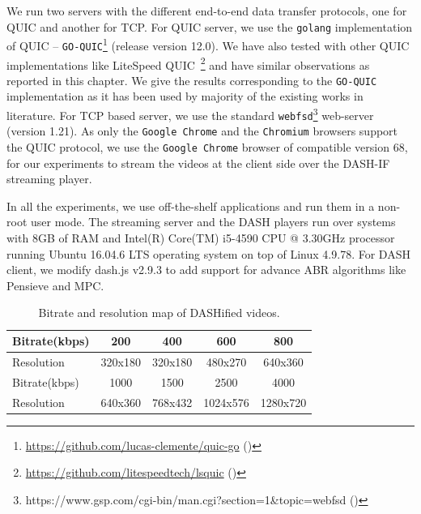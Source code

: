 We run two servers with the different end-to-end data transfer protocols, one for \ac{QUIC} and another for \ac{TCP}. For \ac{QUIC} server, we use the {\tt golang} implementation of \ac{QUIC} -- \texttt{GO-QUIC}\footnote{\url{https://github.com/lucas-clemente/quic-go} (\lastaccessedtoday)} (release version 12.0). We have also tested with other \ac{QUIC} implementations like LiteSpeed \ac{QUIC}~\footnote{\url{https://github.com/litespeedtech/lsquic} (\lastaccessedtoday)} and have similar observations as reported in this chapter. We give the results corresponding to the \texttt{GO-QUIC} implementation as it has been used by majority of the existing works in literature. For TCP based server, we use the standard {\tt webfsd}\footnote{https://www.gsp.com/cgi-bin/man.cgi?section=1\&topic=webfsd (\lastaccessedtoday)} web-server (version 1.21). As only the {\tt Google Chrome} and the {\tt Chromium} browsers support the \ac{QUIC} protocol, we use the {\tt Google Chrome} browser of compatible version 68, for our experiments to stream the videos at the client side over the \ac{DASH-IF} streaming player.


In all the experiments, we use off-the-shelf applications and run them in a non-root user mode. The streaming server and the \ac{DASH} players run over systems with 8GB of RAM and Intel(R) Core(TM) i5-4590 CPU @ 3.30GHz processor running Ubuntu 16.04.6 LTS operating system on top of Linux 4.9.78. For \ac{DASH} client, we modify dash.js v2.9.3 to add support for advance \ac{ABR} algorithms like Pensieve and MPC.


\begin{table}[h]
     \caption{\label{table:chap03s2:bitrate}Bitrate and resolution map of DASHified videos.}
	\centering
	\begin{tabular}{|l|c|c|c|c|}
		\hline
		Bitrate(kbps) & 200 & 400 & 600 & 800 \\ \hline
		Resolution & 320x180 & 320x180 & 480x270 & 640x360 \\ \hline \hline
		Bitrate(kbps) & 1000 & 1500 & 2500 & 4000 \\ \hline
		Resolution & 640x360 & 768x432 & 1024x576 & 1280x720 \\ \hline
	\end{tabular}
\end{table}

